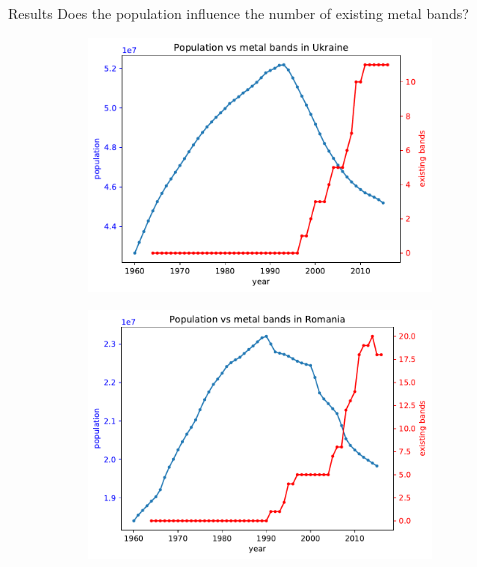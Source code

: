 \documentclass{beamer}
\begin{document}
\begin{frame}{Results}
	Does the population influence the number of existing metal bands?
	
	\begin{figure}
		\begin{subfigure}[b]{0.315\textwidth}
			\includegraphics[width=\textwidth]{Population-Bands/populationVsBandUkraine}
		\end{subfigure}
		\begin{subfigure}[b]{0.3\textwidth}
			\includegraphics[width=\textwidth]{Population-Bands/populationVsBandRomania}
		\end{subfigure}
		\begin{subfigure}[b]{0.3\textwidth}

\end{subfigure}
\end{figure}
\end{frame}
\end{document}
